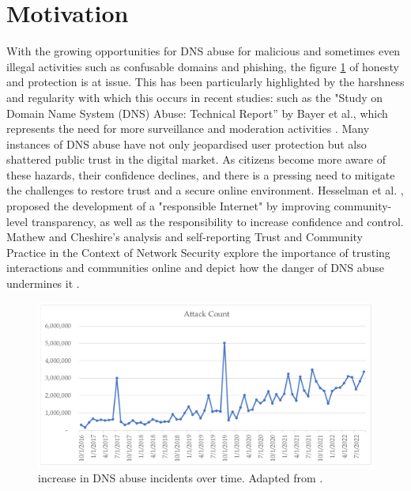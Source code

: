 \section{Motivation}

With the growing opportunities for DNS abuse for malicious and sometimes even illegal activities such as confusable domains and phishing, the figure \ref{fig:dnsintro2} of honesty and protection is at issue. This has been particularly highlighted by the harshness and regularity with which this occurs in recent studies: such as the "Study on Domain Name System (DNS) Abuse: Technical Report” by Bayer et al., which represents the need for more surveillance and moderation activities \cite{bayer2022}. Many instances of DNS abuse have not only jeopardised user protection but also shattered public trust in the digital market. As citizens become more aware of these hazards, their confidence declines, and there is a pressing need to mitigate the challenges to restore trust and a secure online environment. Hesselman et al. \cite{hesselman2020}, proposed the development of a "responsible Internet" by improving community-level transparency, as well as the responsibility to increase confidence and control. Mathew and Cheshire's analysis and self-reporting Trust and Community Practice in the Context of Network Security explore the importance of trusting interactions and communities online and depict how the danger of DNS abuse undermines it \cite{mathew2016}.

\begin{figure}[H]
    \centering
    \includegraphics[width=0.5\linewidth]{introduction/maliciousActivity.png}
    \caption{ increase in DNS abuse incidents over time. Adapted from \cite{Rich2023Cyberpsychology}.}
    \label{fig:dnsintro2}
\end{figure}

